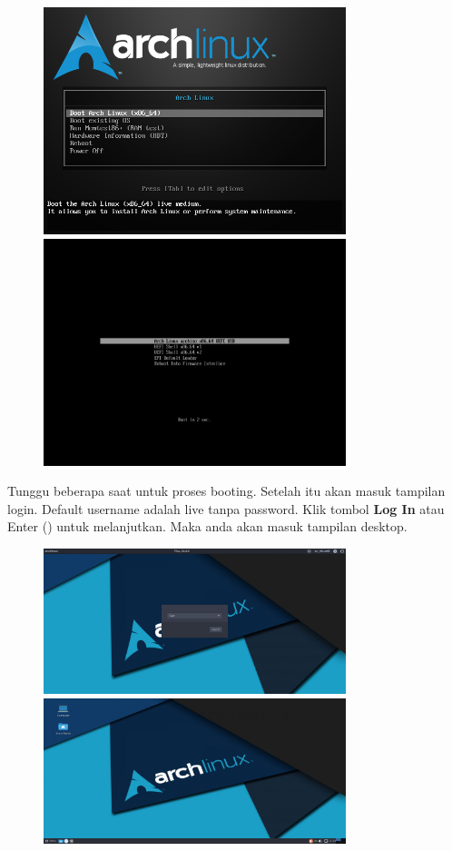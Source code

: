 \documentclass[12pt,]{article}
\begin{document}
	\begin{figure}[h]
		\centering
		\includegraphics[width=250pt]{installhdd/step_1a}
		\includegraphics[width=250pt]{installhdd/step_1b}
	\end{figure}  

	Tunggu beberapa saat untuk proses booting.
	Setelah itu akan masuk tampilan login.
	Default username adalah live tanpa password.
	Klik tombol \textbf{Log In} atau Enter (\keys{\return}) untuk melanjutkan.
	Maka anda akan masuk tampilan desktop.
	
	\begin{figure}[h]
		\centering
		\includegraphics[width=250pt]{installhdd/step_2}
		\includegraphics[width=250pt]{installhdd/step_3}
	\end{figure} 
	
\end{document}
